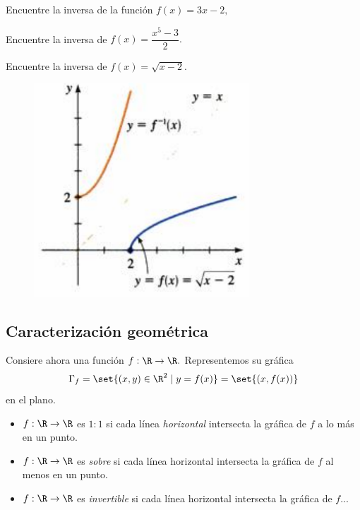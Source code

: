 \begin{problema}
Encuentre la inversa de la función $f(x)=3x-2,$
\end{problema}




\begin{problema}
Encuentre la inversa de $f(x)=\dfrac{x^{5}-3}{2}.$
\end{problema}




\begin{problema}
Encuentre la inversa de $f(x)=\sqrt{x-2}.$
\end{problema}




\begin{figure}[h!]
\centering
\includegraphics[height=8cm,keepaspectratio=true]{./md/MD02_sqrt_x-2.png}
\label{fig:MD02_sqrt_x-2}
\end{figure}


%
\subsection{Caracterización geom\'etrica}


Consiere ahora una función $f:\R \to \R.$ Representemos su gráfica 
$$
\Gamma_{f}=\set{(x,y)\in\R^{2}\mid y=f(x)}
=\set{(x,f(x))}
$$
en el plano.




\begin{rem}
\begin{itemize}
\item $f:\R \to \R$ es \emph{$1:1$} si cada línea \emph{horizontal} intersecta la gráfica de $f$ a lo más en un punto.
\item $f:\R \to \R$ es \emph{sobre} si cada línea horizontal intersecta la gráfica de $f$ al menos en un punto.
\item $f:\R \to \R$ es \emph{invertible} si cada línea horizontal intersecta la gráfica de $f$...
\end{itemize}

\end{rem}



